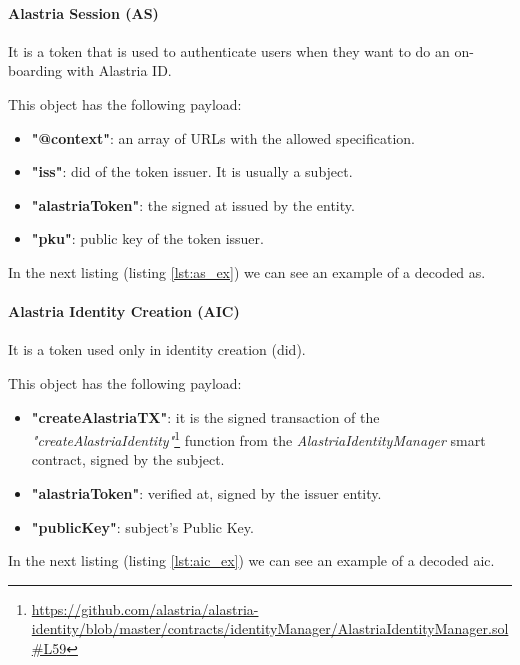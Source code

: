 \documentclass[a4paper, 12pt]{article} %
\begin{document}
            \paragraph{Alastria Session (AS)}
                It is a token that is used to authenticate users when they want to do an on-boarding with Alastria ID.
                
                This object has the following payload:
                \begin{itemize}
                    \item \textbf{"@context"}: an array of URLs with the allowed specification.
                    \item \textbf{"iss"}: \acrshort{did} of the token issuer. It is usually a subject.
                    \item \textbf{"alastriaToken"}: the signed \acrlong{at} issued by the entity.
                    \item \textbf{"pku"}: public key of the token issuer.
                \end{itemize}
                In the next listing (listing \ref{lst:as_ex}) we can see an example of a decoded \acrlong{as}.
                
                
            \paragraph{Alastria Identity Creation (AIC)}
                It is a token used only in identity creation (\acrshort{did}).
                
                This object has the following payload:
                \begin{itemize}
                    \item \textbf{"createAlastriaTX"}: it is the signed transaction of the \textit{"createAlastriaIdentity"}\footnote{\url{https://github.com/alastria/alastria-identity/blob/master/contracts/identityManager/AlastriaIdentityManager.sol\#L59}} function from the \textit{AlastriaIdentityManager} smart contract, signed by the subject.
                    \item \textbf{"alastriaToken"}: verified \acrlong{at}, signed by the issuer entity.
                    \item \textbf{"publicKey"}: subject's Public Key.
                \end{itemize}
                In the next listing (listing \ref{lst:aic_ex}) we can see an example of a decoded \acrlong{aic}.
                
                
\end{document}
